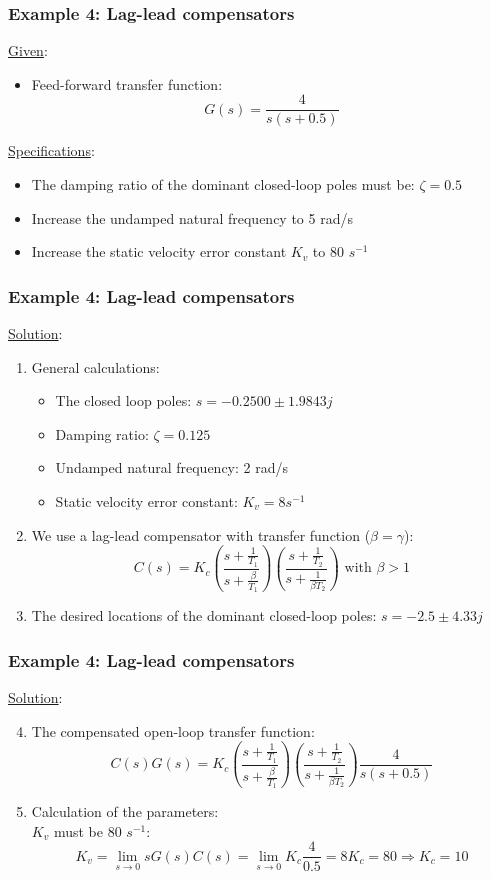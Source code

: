 \begin{frame}
	\frametitle{Example 4: Lag-lead compensators}
	\underline{Given}:
	\begin{itemize}
		\item Feed-forward transfer function: $$G(s)=\frac{4}{s(s+0.5)}$$
	\end{itemize}
	\underline{Specifications}:
	\begin{itemize}
		\item The damping ratio of the dominant closed-loop poles must be: $\zeta=0.5$
		\item Increase the undamped natural frequency to 5 rad/s
		\item Increase the static velocity error constant $K_v$ to 80 $s^{-1}$
	\end{itemize}
\end{frame}

\begin{frame}
	\frametitle{Example 4: Lag-lead compensators}
	\underline{Solution}:
	\begin{enumerate}
		\item General calculations:
		\begin{itemize}
			\item The closed loop poles: $s=-0.2500\pm1.9843j$
			\item Damping ratio: $\zeta=0.125$
			\item Undamped natural frequency: 2 rad/s
			\item Static velocity error constant: $K_v=8s^{-1}$
		\end{itemize}
		\item We use a lag-lead compensator with transfer function ($\beta=\gamma$):
		$$C(s)=K_c\left(\frac{s+\frac{1}{T_1}}{s+\frac{\beta}{T_1}}\right)\left(\frac{s+\frac{1}{T_2}}{s+\frac{1}{\beta T_2}}\right) \text{ with } \beta>1$$
		\item The desired locations of the dominant closed-loop poles: $s=-2.5\pm 4.33j$
	\end{enumerate}
\end{frame}

\begin{frame}
	\frametitle{Example 4: Lag-lead compensators}
	\underline{Solution}:
	\begin{enumerate}
		\setcounter{enumi}{3}
		\item The compensated open-loop transfer function:
		$$C(s)G(s)=K_c \left(\frac{s+\frac{1}{T_1}}{s+\frac{\beta}{T_1}}\right)\left(\frac{s+\frac{1}{T_2}}{s+\frac{1}{\beta T_2}}\right)\frac{4}{s(s+0.5)}$$
		\item Calculation of the parameters:\\
		$K_v$ must be 80 $s^{-1}$:
		$$K_v=\lim_{s\to0}sG(s)C(s)=\lim_{s\to0}K_c\frac{4}{0.5}=8K_c=80 \Rightarrow K_c=10$$
	\end{enumerate}
\end{frame}

